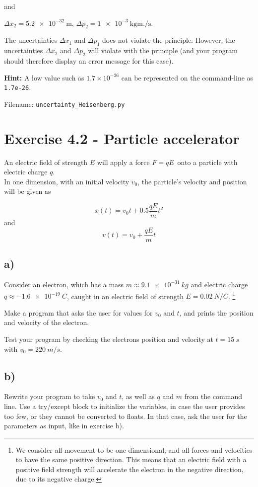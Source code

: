 \documentclass[10pt,a4paper]{article}
\begin{document}
and

$\Delta x_2 = \SI{5.2e-32}{\m}$, $\Delta p_2 = \SI{1e-3}{\kg \meter .\per \second}$.

The uncertainties $\Delta x_1$ and $\Delta p_1$ does not violate the principle. However, the uncertainties $\Delta x_2$ and $\Delta p_2$ will violate with the principle (and your program should therefore display an error message for this case). 

\textbf{Hint:} A low value such as $1.7\times 10^{-26}$ can be represented on the command-line as \texttt{1.7e-26}. 

Filename: \texttt{uncertainty\_Heisenberg.py}


\section*{Exercise 4.2 - Particle accelerator}
An electric field of strength $E$ will apply a force $F = qE$ onto a particle with electric charge $q$.\\
In one dimension, with an initial velocity $v_0$, the particle's velocity and position will be given as

\[	x(t) = v_0t + 0.5\frac{q E}{m} t^2
\]
and
\[	v(t) = v_0 + \frac{q E}{m} t
\]

\subsection*{a)}
Consider an electron, which has a mass $m\approx \SI{9.1e-31}{kg}$ and electric charge $q \approx \SI{-1.6e-19}{C}$, caught in an electric field of strength $E = \SI{0.02}{N/C}$. \footnote{We consider all movement to be one dimensional, and all forces and velocities to have the same positive direction. This means that an electric field with a positive field strength will accelerate the electron in the negative direction, due to its negative charge.}

Make a program that asks the user for values for $v_0$ and $t$, and prints the position and velocity of the electron.

Test your program by checking the electrons position and velocity at $t = \SI{15}{s}$ with $v_0 = \SI{220}{m/s}$.

\subsection*{b)}
Rewrite your program to take $v_0$ and $t$, as well as $q$ and $m$ from the command line. Use a try/except block to initialize the variables, in case the user provides too few, or they cannot be converted to floats. In that case, ask the user for the parameters as input, like in exercise b).
\end{document}
